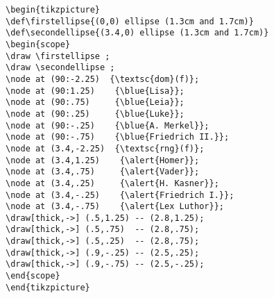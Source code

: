 
\begin{frame}[fragile]

\begin{minipage}{.67\textwidth}
{\tiny
\begin{lstlisting}	
\begin{tikzpicture}
\def\firstellipse{(0,0) ellipse (1.3cm and 1.7cm)}
\def\secondellipse{(3.4,0) ellipse (1.3cm and 1.7cm)}
\begin{scope} 
\draw \firstellipse ;
\draw \secondellipse ;	
\node at (90:-2.25)  {\textsc{dom}(f)};
\node at (90:1.25)    {\blue{Lisa}}; 
\node at (90:.75)     {\blue{Leia}};
\node at (90:.25)     {\blue{Luke}};
\node at (90:-.25)    {\blue{A. Merkel}};
\node at (90:-.75)    {\blue{Friedrich II.}};
\node at (3.4,-2.25)  {\textsc{rng}(f)};			
\node at (3.4,1.25)    {\alert{Homer}}; 
\node at (3.4,.75)     {\alert{Vader}}; 
\node at (3.4,.25)     {\alert{H. Kasner}}; 
\node at (3.4,-.25)    {\alert{Friedrich I.}}; 
\node at (3.4,-.75)    {\alert{Lex Luthor}}; 
\draw[thick,->] (.5,1.25) -- (2.8,1.25);	
\draw[thick,->] (.5,.75)  -- (2.8,.75);	
\draw[thick,->] (.5,.25)  -- (2.8,.75);
\draw[thick,->] (.9,-.25) -- (2.5,.25);
\draw[thick,->] (.9,-.75) -- (2.5,-.25);
\end{scope}
\end{tikzpicture}
\end{lstlisting}	
}

\end{minipage}
\begin{minipage}{.32\textwidth}
\end{minipage}	

\end{frame}


